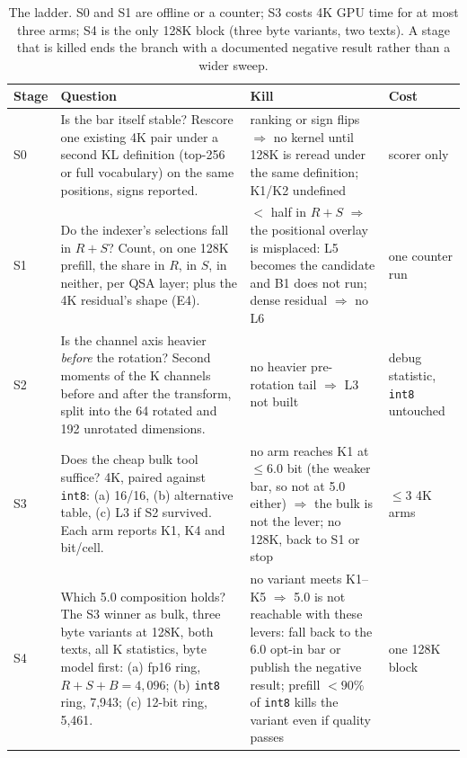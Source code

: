 \documentclass[10pt,twocolumn]{article}
\begin{document}
\begin{table}[t]
\centering
\footnotesize
\caption{The ladder. S0 and S1 are offline or a counter; S3 costs 4K GPU time for at most three arms; S4 is the only 128K block (three byte variants, two texts). A stage that is killed ends the branch with a documented negative result rather than a wider sweep.}
\label{tab:ladder}
\begin{tabularx}{\textwidth}{@{}l>{\raggedright\arraybackslash}X>{\raggedright\arraybackslash}Xl@{}}
\toprule
Stage & Question & Kill & Cost \\
\midrule
S0 & Is the bar itself stable? Rescore one existing 4K pair under a second KL definition (top-256 or full vocabulary) on the same positions, signs reported. & ranking or sign flips $\Rightarrow$ no kernel until 128K is reread under the same definition; K1/K2 undefined & scorer only \\
S1 & Do the indexer's selections fall in $R{+}S$? Count, on one 128K prefill, the share in $R$, in $S$, in neither, per QSA layer; plus the 4K residual's shape (E4). & $<$ half in $R{+}S$ $\Rightarrow$ the positional overlay is misplaced: L5 becomes the candidate and B1 does not run; dense residual $\Rightarrow$ no L6 & one counter run \\
S2 & Is the channel axis heavier \emph{before} the rotation? Second moments of the K channels before and after the transform, split into the 64 rotated and 192 unrotated dimensions. & no heavier pre-rotation tail $\Rightarrow$ L3 not built & debug statistic, \texttt{int8} untouched \\
S3 & Does the cheap bulk tool suffice? 4K, paired against \texttt{int8}: (a) 16/16, (b) alternative table, (c) L3 if S2 survived. Each arm reports K1, K4 and bit/cell. & no arm reaches K1 at $\le 6.0$ bit (the weaker bar, so not at 5.0 either) $\Rightarrow$ the bulk is not the lever; no 128K, back to S1 or stop & $\le 3$ 4K arms \\
S4 & Which 5.0 composition holds? The S3 winner as bulk, three byte variants at 128K, both texts, all K statistics, byte model first: (a) fp16 ring, $R{+}S{+}B{=}4{,}096$; (b) \texttt{int8} ring, 7,943; (c) 12-bit ring, 5,461. & no variant meets K1--K5 $\Rightarrow$ 5.0 is not reachable with these levers: fall back to the 6.0 opt-in bar or publish the negative result; prefill $<90\%$ of \texttt{int8} kills the variant even if quality passes & one 128K block \\
\bottomrule
\end{tabularx}
\end{table}
\end{document}
